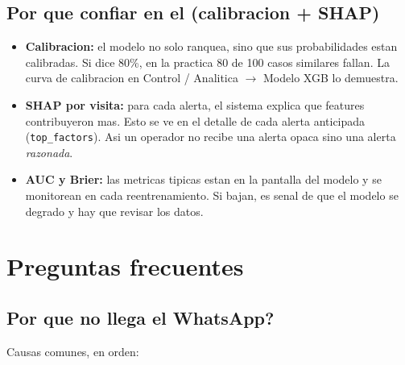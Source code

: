 \documentclass[11pt,a4paper]{article}
\begin{document}
\subsection{Por que confiar en el (calibracion + SHAP)}

\begin{itemize}
  \item \textbf{Calibracion:} el modelo no solo ranquea, sino que sus
        probabilidades estan calibradas. Si dice 80\%, en la practica
        80 de 100 casos similares fallan. La curva de calibracion en
        Control / Analitica $\rightarrow$ Modelo XGB lo demuestra.
  \item \textbf{SHAP por visita:} para cada alerta, el sistema explica
        que features contribuyeron mas. Esto se ve en el detalle de
        cada alerta anticipada (\texttt{top\_factors}). Asi un
        operador no recibe una alerta opaca sino una alerta
        \emph{razonada}.
  \item \textbf{AUC y Brier:} las metricas tipicas estan en la pantalla
        del modelo y se monitorean en cada reentrenamiento. Si bajan,
        es senal de que el modelo se degrado y hay que revisar los
        datos.
\end{itemize}

\section{Preguntas frecuentes}

\subsection{Por que no llega el WhatsApp?}

Causas comunes, en orden:
\end{document}
